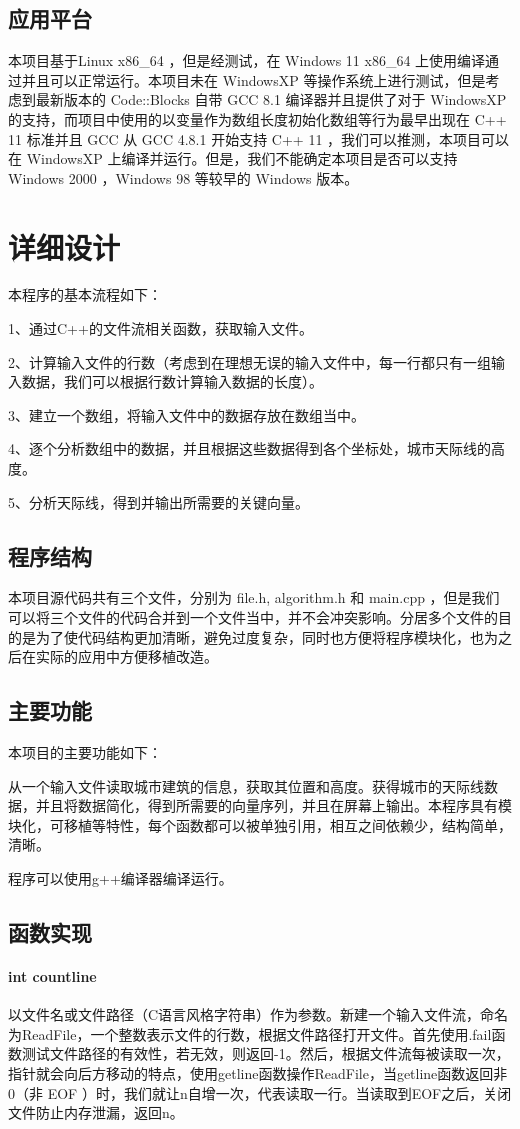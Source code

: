 \documentclass[a4paper]{ctexart}
\begin{document}
	\subsection{应用平台}
	本项目基于Linux x86\_64 ，但是经测试，在 Windows 11 x86\_64 上使用编译通过并且可以正常运行。本项目未在 WindowsXP 等操作系统上进行测试，但是考虑到最新版本的 Code::Blocks 自带 GCC 8.1 编译器并且提供了对于 WindowsXP 的支持，而项目中使用的以变量作为数组长度初始化数组等行为最早出现在 C++ 11 标准并且 GCC 从 GCC 4.8.1 开始支持 C++ 11 ，我们可以推测，本项目可以在 WindowsXP 上编译并运行。但是，我们不能确定本项目是否可以支持 Windows 2000 ，Windows 98 等较早的 Windows 版本。
	\section{详细设计}
	本程序的基本流程如下：

	1、通过C++的文件流相关函数，获取输入文件。

	2、计算输入文件的行数（考虑到在理想无误的输入文件中，每一行都只有一组输入数据，我们可以根据行数计算输入数据的长度）。

	3、建立一个数组，将输入文件中的数据存放在数组当中。

	4、逐个分析数组中的数据，并且根据这些数据得到各个坐标处，城市天际线的高度。

	5、分析天际线，得到并输出所需要的关键向量。
	\subsection{程序结构}
	本项目源代码共有三个文件，分别为 file.h, algorithm.h 和 main.cpp ，但是我们可以将三个文件的代码合并到一个文件当中，并不会冲突影响。分居多个文件的目的是为了使代码结构更加清晰，避免过度复杂，同时也方便将程序模块化，也为之后在实际的应用中方便移植改造。
	\subsection{主要功能}
	本项目的主要功能如下：
	
	从一个输入文件读取城市建筑的信息，获取其位置和高度。获得城市的天际线数据，并且将数据简化，得到所需要的向量序列，并且在屏幕上输出。本程序具有模块化，可移植等特性，每个函数都可以被单独引用，相互之间依赖少，结构简单，清晰。

	程序可以使用g++编译器编译运行。
	\subsection{函数实现}
	\paragraph{int countline}
	以文件名或文件路径（C语言风格字符串）作为参数。新建一个输入文件流，命名为ReadFile，一个整数表示文件的行数，根据文件路径打开文件。首先使用.fail函数测试文件路径的有效性，若无效，则返回-1。然后，根据文件流每被读取一次，指针就会向后方移动的特点，使用getline函数操作ReadFile，当getline函数返回非0（非 EOF ）时，我们就让n自增一次，代表读取一行。当读取到EOF之后，关闭文件防止内存泄漏，返回n。
	
\end{document}

